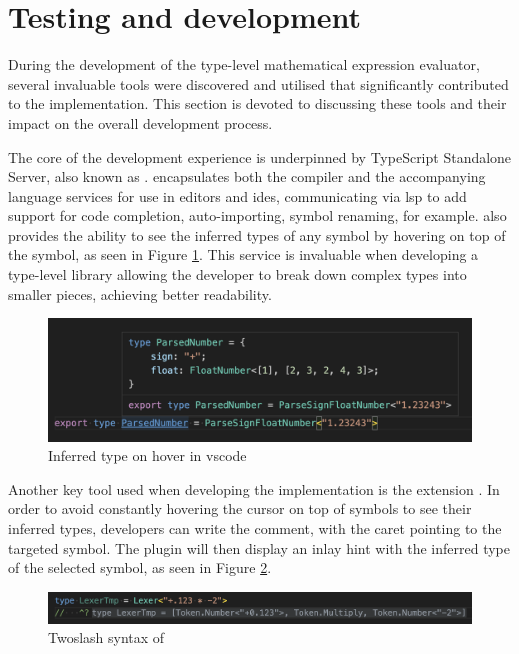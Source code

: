 \section{Testing and development}

During the development of the type-level mathematical expression evaluator, several invaluable tools were discovered and utilised that significantly contributed to the implementation. This section is devoted to discussing these tools and their impact on the overall development process.

The core of the development experience is underpinned by TypeScript Standalone Server, also known as .  encapsulates both the compiler and the accompanying language services for use in editors and \acrshort{ide}s, communicating via \acrshort{lsp} to add support for code completion, auto-importing, symbol renaming, for example.  also provides the ability to see the inferred types of any symbol by hovering on top of the symbol, as seen in Figure \ref{fig:tsserver-hover}. This service is invaluable when developing a type-level library allowing the developer to break down complex types into smaller pieces, achieving better readability.

\begin{figure}[ht]
  \centering
  \includegraphics[width=\textwidth]{text/testing/tsserver-hover.png}
  \caption{Inferred type on hover in \acrshort{vscode}}
  \label{fig:tsserver-hover}
\end{figure}

Another key tool used when developing the implementation is the  extension \cite{theroxVscodetwoslashqueries2023}. In order to avoid constantly hovering the cursor on top of symbols to see their inferred types, developers can write the  comment, with the caret pointing to the targeted symbol. The plugin will then display an inlay hint with the inferred type of the selected symbol, as seen in Figure \ref{fig:twoslash-plugin}.

\clearpage

\begin{figure}[ht]
  \centering
  \includegraphics[width=\textwidth]{text/testing/vscode-twoslash-plugin.png}
  \caption{Twoslash syntax of }
  \label{fig:twoslash-plugin}
\end{figure}

